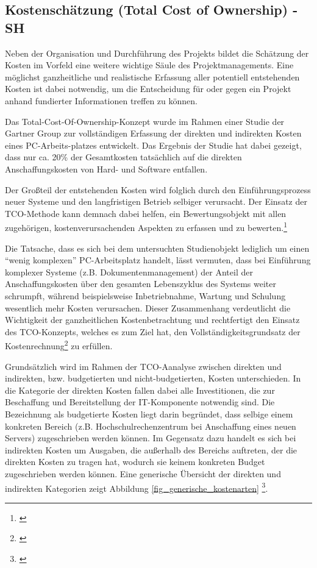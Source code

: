 
\subsection{Kostenschätzung (Total Cost of Ownership) - SH}

\label{subsection_kostenschatzung_TCO}
Neben der Organisation und Durchführung des Projekts bildet die Schätzung der Kosten im Vorfeld 
eine weitere wichtige Säule des Projektmanagements. Eine möglichst ganzheitliche und realistische 
Erfassung aller potentiell entstehenden Kosten ist dabei notwendig, um die Entscheidung für oder 
gegen ein Projekt anhand fundierter Informationen treffen zu können.

Das Total-Cost-Of-Ownership-Konzept wurde im Rahmen einer Studie der Gartner Group 
zur vollständigen Erfassung der direkten und indirekten Kosten eines PC-Arbeits-platzes 
entwickelt. Das Ergebnis der Studie hat dabei gezeigt, dass nur ca. 20\% der Gesamtkosten 
tatsächlich auf die direkten Anschaffungskosten von Hard- und Software entfallen. 

Der Großteil der entstehenden Kosten wird folglich durch den Einführungsprozess neuer 
Systeme und den langfristigen Betrieb selbiger verursacht. Der Einsatz der TCO-Methode 
kann demnach dabei helfen, ein Bewertungsobjekt mit allen zugehörigen, 
kostenverursachenden Aspekten zu erfassen und zu bewerten.\footnote{\cite{hansen_business_2009}}

Die Tatsache, dass es sich bei dem untersuchten Studienobjekt lediglich um einen “wenig komplexen” PC-Arbeitsplatz handelt, lässt vermuten, dass bei Einführung komplexer Systeme (z.B. Dokumentenmanagement) der Anteil der Anschaffungskosten über den gesamten Lebenszyklus des Systems weiter schrumpft, während beispielsweise Inbetriebnahme, Wartung und Schulung wesentlich mehr Kosten verursachen. Dieser Zusammenhang verdeutlicht die Wichtigkeit der ganzheitlichen Kostenbetrachtung und rechtfertigt den Einsatz des TCO-Konzepts, welches es zum Ziel hat, den Vollständigkeitsgrundsatz der Kostenrechnung\footnote{\cite{grob_einfuhrung_2004}} zu erfüllen.

Grundsätzlich wird im Rahmen der TCO-Aanalyse zwischen direkten und indirekten, bzw. budgetierten und nicht-budgetierten, Kosten unterschieden. In die Kategorie der direkten Kosten fallen dabei alle Investitionen, die zur Beschaffung und Bereitstellung der IT-Komponente notwendig sind. Die Bezeichnung als budgetierte Kosten liegt darin begründet, dass selbige einem konkreten Bereich (z.B. Hochschulrechenzentrum bei Anschaffung eines neuen Servers) zugeschrieben werden können. Im Gegensatz dazu handelt es sich bei indirekten Kosten um Ausgaben, die außerhalb des Bereichs auftreten, der die direkten Kosten zu tragen hat, wodurch sie keinem konkreten Budget zugeschrieben werden können. Eine generische Übersicht der direkten und indirekten Kategorien zeigt Abbildung \ref{fig_generische_kostenarten} \footnote{\cite{hansen_business_2009}}.

